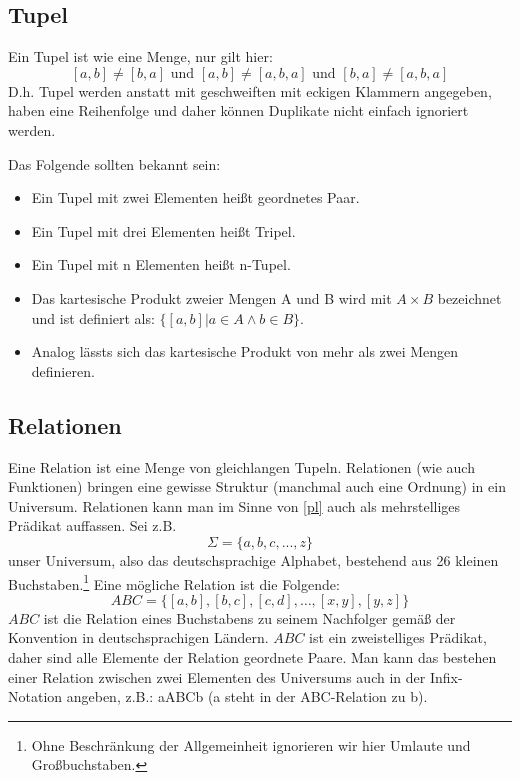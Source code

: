 \subsection{Tupel}

Ein Tupel ist wie eine Menge, nur gilt hier:
\[[a,b] \neq [b,a] \text{ und } [a,b] \neq [a,b,a] \text{ und } [b,a] \neq [a,b,a]\]
D.h. Tupel werden anstatt mit geschweiften mit eckigen Klammern angegeben,
haben eine Reihenfolge und daher können Duplikate nicht einfach ignoriert werden.

\noindent
Das Folgende sollten bekannt sein:
\begin{itemize}
    \item Ein Tupel mit zwei Elementen heißt geordnetes Paar.
    \item Ein Tupel mit drei Elementen heißt Tripel. 
    \item Ein Tupel mit n    Elementen heißt n-Tupel.
    \item Das kartesische Produkt zweier Mengen A und B wird mit $A \times B$ bezeichnet
          und ist definiert als: $\{[a,b]|a \in A \wedge b \in B\}$.
    \item Analog lässts sich das kartesische Produkt von mehr als zwei Mengen definieren.
\end{itemize}

\subsection{Relationen}

Eine Relation ist eine Menge von gleichlangen Tupeln.
Relationen (wie auch Funktionen) bringen eine gewisse Struktur (manchmal auch eine Ordnung)
in ein Universum.
Relationen kann man im Sinne von \autoref{pl} auch als mehrstelliges Prädikat auffassen.
Sei z.B.
\[
    \Sigma = \{a,b,c,...,z\}
\]
unser Universum, also das deutschsprachige Alphabet,
bestehend aus 26 kleinen Buchstaben.\footnote{
Ohne Beschränkung der Allgemeinheit ignorieren wir hier Umlaute und Großbuchstaben.}
Eine mögliche Relation ist die Folgende:
\[
    ABC = \{[a,b], [b,c], [c,d], \ldots, [x,y], [y,z]\}
\]
$ABC$ ist die Relation eines Buchstabens zu seinem Nachfolger
gemäß der Konvention in deutschsprachigen Ländern.
$ABC$ ist ein zweistelliges Prädikat, daher sind alle Elemente der Relation geordnete Paare.
Man kann das bestehen einer Relation zwischen zwei Elementen des Universums
auch in der Infix-Notation angeben, z.B.: aABCb (a steht in der ABC-Relation zu b).

